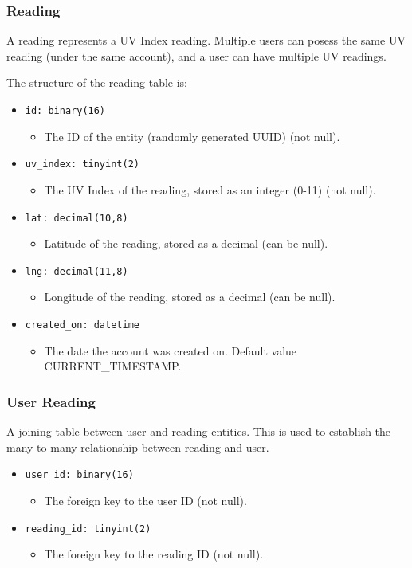 \documentclass[12pt,openany,a4paper]{book}
\begin{document}
\subsubsection{Reading}

A reading represents a UV Index reading. Multiple users can posess the same UV
reading (under the same account), and a user can have multiple UV readings.

The structure of the reading table is:

\begin{itemize}
	\item \verb|id: binary(16)|
	\begin{itemize}
		\item The ID of the entity (randomly generated UUID) (not null).
	\end{itemize}
	\item \verb|uv_index: tinyint(2)|
	\begin{itemize}
		\item The UV Index of the reading, stored as an integer (0-11) (not null).
	\end{itemize}
	\item \verb|lat: decimal(10,8)|
	\begin{itemize}
		\item Latitude of the reading, stored as a decimal (can be null).
	\end{itemize}
	\item \verb|lng: decimal(11,8)|
	\begin{itemize}
		\item Longitude of the reading, stored as a decimal (can be null).
	\end{itemize}
	\item \verb|created_on: datetime|
	\begin{itemize}
		\item The date the account was created on. Default value
		CURRENT\_TIMESTAMP.
	\end{itemize}
\end{itemize}

\subsubsection{User Reading}

A joining table between user and reading entities. This is used to establish
the many-to-many relationship between reading and user.

\begin{itemize}
	\item \verb|user_id: binary(16)|
	\begin{itemize}
		\item The foreign key to the user ID (not null).
	\end{itemize}
	\item \verb|reading_id: tinyint(2)|
	\begin{itemize}
		\item The foreign key to the reading ID (not null).
	\end{itemize}
\end{itemize}
\end{document}
